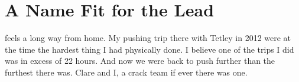 
\section{A Name Fit for the Lead}


 feels a long way from home. My pushing trip there with Tetley in 2012 were at the time the hardest thing I had physically done. I believe one of the trips I did was in excess of 22 hours. And now we were back to push further than the furthest there was. Clare and I, a crack team if ever there was one. 


